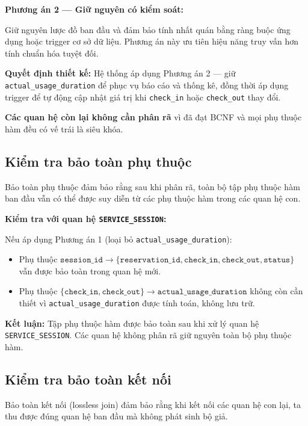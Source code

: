 \textbf{Phương án 2 — Giữ nguyên có kiểm soát:}

Giữ nguyên lược đồ ban đầu và đảm bảo tính nhất quán bằng ràng buộc ứng dụng hoặc trigger cơ sở dữ liệu. Phương án này ưu tiên hiệu năng truy vấn hơn tính chuẩn hóa tuyệt đối.

\textbf{Quyết định thiết kế:} Hệ thống áp dụng Phương án 2 — giữ \texttt{actual\_usage\_duration} để phục vụ báo cáo và thống kê, đồng thời áp dụng trigger để tự động cập nhật giá trị khi \texttt{check\_in} hoặc \texttt{check\_out} thay đổi.

\textbf{Các quan hệ còn lại không cần phân rã} vì đã đạt BCNF và mọi phụ thuộc hàm đều có vế trái là siêu khóa.

\subsection{Kiểm tra bảo toàn phụ thuộc}

Bảo toàn phụ thuộc đảm bảo rằng sau khi phân rã, toàn bộ tập phụ thuộc hàm ban đầu vẫn có thể được suy diễn từ các phụ thuộc hàm trong các quan hệ con.

\textbf{Kiểm tra với quan hệ \texttt{SERVICE\_SESSION}:}

Nếu áp dụng Phương án 1 (loại bỏ \texttt{actual\_usage\_duration}):

\begin{itemize}
    \item Phụ thuộc $\texttt{session\_id} \rightarrow \{\texttt{reservation\_id}, \texttt{check\_in}, \texttt{check\_out}, \texttt{status}\}$ vẫn được bảo toàn trong quan hệ mới.
    \item Phụ thuộc $\{\texttt{check\_in}, \texttt{check\_out}\} \rightarrow \texttt{actual\_usage\_duration}$ không còn cần thiết vì \texttt{actual\_usage\_duration} được tính toán, không lưu trữ.
\end{itemize}

\textbf{Kết luận:} Tập phụ thuộc hàm được bảo toàn sau khi xử lý quan hệ \texttt{SERVICE\_SESSION}. Các quan hệ không phân rã giữ nguyên toàn bộ phụ thuộc hàm.

\subsection{Kiểm tra bảo toàn kết nối}

Bảo toàn kết nối (lossless join) đảm bảo rằng khi kết nối các quan hệ con lại, ta thu được đúng quan hệ ban đầu mà không phát sinh bộ giả.

